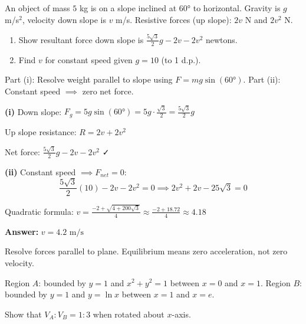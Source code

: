 \begin{problem}
An object of mass $5$ kg is on a slope inclined at $60°$ to horizontal. Gravity is $g$ m/s$^2$, velocity down slope is $v$ m/s. Resistive forces (up slope): $2v$ N and $2v^2$ N.

\begin{enumerate}[label=(\roman*)]
\item Show resultant force down slope is $\frac{5\sqrt{3}}{2}g - 2v - 2v^2$ newtons.
\item Find $v$ for constant speed given $g = 10$ (to 1 d.p.).
\end{enumerate}
\end{problem}

\begin{hint}
Part (i): Resolve weight parallel to slope using $F = mg\sin(60°)$. Part (ii): Constant speed $\implies$ zero net force.
\end{hint}

\begin{solution}
\textbf{(i)} Down slope: $F_g = 5g\sin(60°) = 5g \cdot \frac{\sqrt{3}}{2} = \frac{5\sqrt{3}}{2}g$

Up slope resistance: $R = 2v + 2v^2$

Net force: $\boxed{\frac{5\sqrt{3}}{2}g - 2v - 2v^2}$ ✓

\textbf{(ii)} Constant speed $\implies F_{net} = 0$:
\[
\frac{5\sqrt{3}}{2}(10) - 2v - 2v^2 = 0 \implies 2v^2 + 2v - 25\sqrt{3} = 0
\]

Quadratic formula: $v = \frac{-2 + \sqrt{4 + 200\sqrt{3}}}{4} \approx \frac{-2 + 18.72}{4} \approx 4.18$

\textbf{Answer:} $\boxed{v = 4.2 \text{ m/s}}$
\end{solution}

\begin{takeaways}
Resolve forces parallel to plane. Equilibrium means zero acceleration, not zero velocity.
\end{takeaways}

\vspace{1cm}

\begin{problem}
Region $A$: bounded by $y=1$ and $x^2 + y^2 = 1$ between $x=0$ and $x=1$.
Region $B$: bounded by $y=1$ and $y = \ln x$ between $x=1$ and $x=e$.

Show that $V_A : V_B = 1:3$ when rotated about $x$-axis.
\end{problem}

